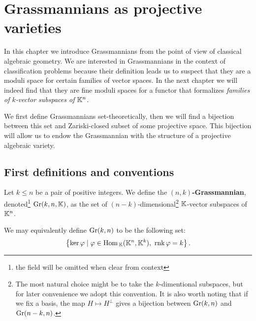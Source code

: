 \chapter{Grassmannians as projective varieties}
In this chapter we introduce Grassmannians from the point of view of classical algebraic geometry. We are interested in Grassmannians in the context of classification problems because their definition leads us to suspect that they are a moduli space for certain families of vector spaces. In the next chapter we will indeed find that they are fine moduli spaces for a functor that formalizes \textit{families of $k$-vector subspaces of $\mathbb{K}^n$}.\medskip

We first define Grassmannians set-theoretically, then we will find a bijection between this set and Zariski-closed subset of some projective space. This bijection will allow us to endow the Grassmannian with the structure of a projective algebraic variety.

\section{First definitions and conventions}
\begin{definition}[Grassmannian]
Let $k\leq n$ be a pair of positive integers. We define the \textbf{$(n,k)$-Grassmannian}, denoted\footnote{the field will be omitted when clear from context} $\mathrm{Gr}(k,n,\mathbb{K})$, as the set of $(n-k)$-dimensional\footnote{The most natural choice might be to take the $k$-dimentional subspaces, but for later convenience we adopt this convention. It is also worth noting that if we fix a basis, the map $H\mapsto H^\perp$ gives a  bijection between $\mathrm{Gr}(k,n)$ and $\mathrm{Gr}(n-k,n)$.} $\mathbb{K}$-vector subspaces of $\mathbb{K}^n$.
\end{definition}


\begin{remark}
We may equivalently define $\mathrm{Gr}(k,n)$ to be the following set:
\[\cpa{\ker \vp\mid \vp\in \Hom_\K(\K^n,\K^k),\ \rnk \vp=k}.\]
\end{remark}

